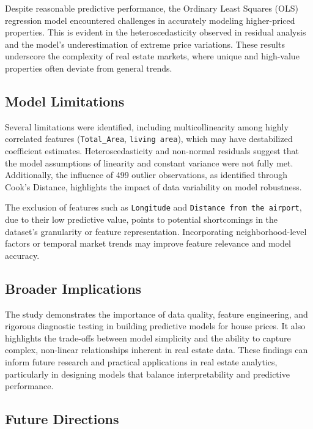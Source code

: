 \documentclass[11pt]{article}
\begin{document}
Despite reasonable predictive performance, the Ordinary Least Squares (OLS) regression model encountered challenges in accurately modeling higher-priced properties. This is evident in the heteroscedasticity observed in residual analysis and the model's underestimation of extreme price variations. These results underscore the complexity of real estate markets, where unique and high-value properties often deviate from general trends.

\subsection{Model Limitations}

Several limitations were identified, including multicollinearity among highly correlated features (\texttt{Total\_Area}, \texttt{living area}), which may have destabilized coefficient estimates. Heteroscedasticity and non-normal residuals suggest that the model assumptions of linearity and constant variance were not fully met. Additionally, the influence of 499 outlier observations, as identified through Cook's Distance, highlights the impact of data variability on model robustness.

The exclusion of features such as \texttt{Longitude} and \texttt{Distance from the airport}, due to their low predictive value, points to potential shortcomings in the dataset's granularity or feature representation. Incorporating neighborhood-level factors or temporal market trends may improve feature relevance and model accuracy.

\subsection{Broader Implications}

The study demonstrates the importance of data quality, feature engineering, and rigorous diagnostic testing in building predictive models for house prices. It also highlights the trade-offs between model simplicity and the ability to capture complex, non-linear relationships inherent in real estate data. These findings can inform future research and practical applications in real estate analytics, particularly in designing models that balance interpretability and predictive performance.

\subsection{Future Directions}
\end{document}
